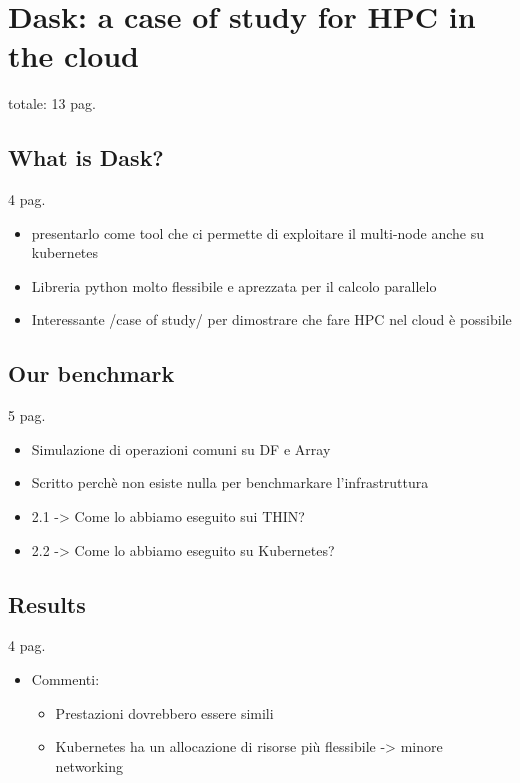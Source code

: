\chapter{Dask: a case of study for HPC in the cloud}\label{ch:dask}

totale: 13 pag.

\section{What is Dask?}\label{sec:daskintro}

4 pag.

\begin{itemize}
  \item presentarlo come tool che ci permette di exploitare il multi-node anche
    su kubernetes
  \item Libreria python molto flessibile e aprezzata per il calcolo parallelo
  \item Interessante /case of study/ per dimostrare che fare HPC nel cloud è possibile
\end{itemize}


\section{Our benchmark}\label{sec:daskbenchmark}

5 pag.

\begin{itemize}
  \item Simulazione di operazioni comuni su DF e Array
  \item Scritto perchè non esiste nulla per benchmarkare l'infrastruttura
  \item 2.1 -> Come lo abbiamo eseguito sui THIN?
  \item 2.2 -> Come lo abbiamo eseguito su Kubernetes?
\end{itemize}

\section{Results}\label{sec:daskresults}

4 pag.

\begin{itemize}
  \item Commenti:
    \begin{itemize}
      \item Prestazioni dovrebbero essere simili
      \item Kubernetes ha un allocazione di risorse più flessibile -> minore networking
    \end{itemize}
\end{itemize}
